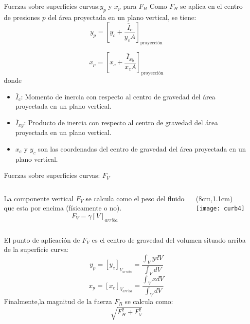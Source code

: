 \documentclass [xcolor=svgnames, t] {beamer}
\begin{document}
\begin{frame}{Fuerzas sobre superficies curvas:$y_p$ y $x_p$ para $F_H$}
Como $F_H$ se aplica en el centro de presiones $p$ del \'area proyectada en un plano vertical, se tiene:
$$
y_p = \left[ y_c + \frac{\bar{I}_c}{y_c A} \right]_{\text{proyecci\'on}}
$$

$$
x_p = \left[ x_c + \frac{\bar{I}_{xy}}{x_c A} \right]_{\text{proyecci\'on}}
$$
donde
\begin{itemize}
\item $\bar{I}_c$: Momento de inercia con respecto al centro de gravedad del \'area proyectada en un plano vertical.
\item $\bar{I}_{xy}$: Producto de inercia con respecto al centro de gravedad del \'area proyectada en un plano vertical.
\item $x_c$ y $y_c$ son las coordenadas del centro de gravedad del \'area proyectada en un plano vertical.
\end{itemize}
\end{frame}

\begin{frame}{Fuerzas sobre superficies curvas: $F_V$}
\begin{columns}
La componente vertical $F_V$ se calcula como el peso del fluido que esta por encima (f\'isicamente o no). 
$$
F_V = \gamma [V]_{arriba}
$$
\begin{textblock*}{3cm}(8cm,1.1cm) %
\texttt{[image: curb4]}
\end{textblock*}
\end{columns}
\vspace{0.8cm}
El punto de aplicaci\'on de $F_V$ es el centro de gravedad del volumen situado arriba de la superficie curva:
$$
y_p = [y_c ]_{V_{arriba}} = \frac{\int_V y dV}{\int_V dV}
$$
$$
x_p = [x_c ]_{V_{arriba}}= \frac{\int_V x dV}{\int_V dV}
$$
Finalmente,la magnitud de la fuerza $F_R$ se calcula como:
$$
\sqrt{F_H^2 + F_V^2}
$$
\end{frame}

\end{document}
